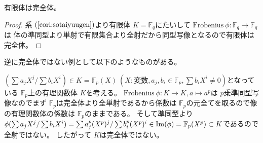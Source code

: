 \documentclass[../master_galois_theory]{subfiles}
\begin{document}
\begin{prop}
  有限体は完全体。
\end{prop}

\begin{proof}
  系 $(\mathrm{\ref{corl:sotaiyuugen}})$より有限体 $K = \mathbb{F}_q$にたいして
  $\mathrm{Frobenius} \  \phi : \mathbb{F}_q \longrightarrow \mathbb{F}_q$は
  体の準同型より単射で有限集合より全射だから同型写像となるので有限体は完全体。
\end{proof}

\begin{exam}
  逆に完全体ではない例として以下のようなものがある。

  $(\sum a_j X^j / \sum b_i X^i) \in K = \mathbb{F}_p(X) \  (X : 変数 , a_j , b_i \in \mathbb{F}_p , \sum b_i X^i \neq 0)$となっている
  $\mathbb{F}_p$上の有理関数体 $K$を考える。
  $\mathrm{Frobenius} \  \phi : K \longrightarrow K , a \longmapsto a^p$は
  $p$乗準同型写像なのでまず $\mathbb{F}_p$は完全体より全単射であるから係数は $\mathbb{F}_p$の元全てを取るので像の有理関数体の係数は $\mathbb{F}_p$のままである。
  そして準同型より$\phi(\sum a_j X^j / \sum b_i X^i) = \sum a_j^p (X^p)^j / \sum b_i^p (X^p)^i \in \mathrm{Im}(\phi) = \mathbb{F}_p(X^p) \subset K$であるので
  全射ではない。
  したがって $K$は完全体ではない。
\end{exam}

\clearpage
\end{document}
